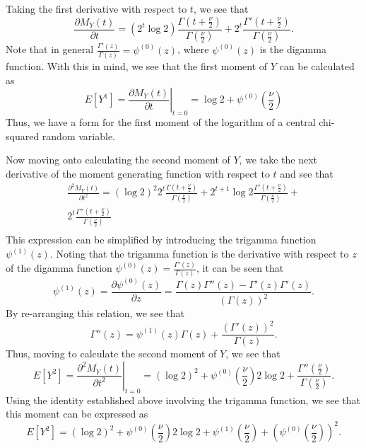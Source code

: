 Taking the first derivative with respect to $t$, we see that
\begin{equation}
	\frac{\partial M_Y(t)}{\partial t} = (2^t \log 2) \frac{\Gamma (t + \frac{\nu}{2})}{\Gamma (\frac{\nu}{2})} + 2^t \frac{\Gamma ' (t + \frac{\nu}{2})}{\Gamma (\frac{\nu}{2})} .
\end{equation}
Note that in general $\frac{\Gamma ' (z)}{\Gamma (z)} = \psi^{(0)}(z)$, where $\psi^{(0)}(z)$ is the digamma function. With this in mind, we see that the first moment of
$Y$ can be calculated as
\begin{equation}
	E \left[ Y^1 \right] =  \left. \frac{\partial M_Y(t)}{\partial t} \right|_{t=0} = \log 2 + \psi^{(0)} \left( \frac{\nu}{2} \right)
\end{equation}
Thus, we have a form for the first moment of the logarithm of a central chi-squared random variable.

Now moving onto calculating the second moment of $Y$, we take the next derivative of the moment generating function with respect to $t$ and see that
\begin{equation}
	\begin{split}
		\frac{\partial^2 M_Y(t)}{\partial t^2} = (\log 2)^2 2^t  \frac{\Gamma (t + \frac{\nu}{2})}{\Gamma (\frac{\nu}{2})} + 2^{t+1} \log 2 \frac{\Gamma ' (t + \frac{\nu}{2})}{\Gamma (\frac{\nu}{2})} + \\ 
		2^t \frac{\Gamma '' (t + \frac{\nu}{2})}{\Gamma (\frac{\nu}{2})} \\
	\end{split}
\end{equation}
This expression can be simplified by introducing the trigamma function $ \psi^{(1)}(z)$. Noting that the trigamma function is the derivative with respect
to $z$ of the digamma function $\psi^{(0)}(z) = \frac{\Gamma ' (z)}{\Gamma (z)}$, it can be seen that
\begin{equation}
	\psi^{(1)}(z) = \frac{\partial \psi^{(0)}(z)}{\partial z} = \frac{\Gamma (z) \Gamma '' (z) - \Gamma '(z) \Gamma '(z)}{(\Gamma(z))^2} .
\end{equation}
By re-arranging this relation, we see that
\begin{equation}
	\Gamma ''(z) = \psi^{(1)}(z) \Gamma(z) + \frac{(\Gamma '(z))^2}{\Gamma(z)} .
\end{equation}
Thus, moving to calculate the second moment of $Y$, we see that
\begin{equation}
	E \left[ Y^2 \right] =  \left. \frac{\partial^2 M_Y(t)}{\partial t^2} \right|_{t=0} =
	(\log 2)^2 + \psi^{(0)} \left( \frac{\nu}{2} \right) 2 \log 2  + \frac{\Gamma '' (\frac{\nu}{2})}{\Gamma (\frac{\nu}{2})} .
\end{equation}
Using the identity established above involving the trigamma function, we see that this moment can be expressed as
\begin{equation}
	E \left[ Y^2 \right] =
	(\log 2)^2 + \psi^{(0)} \left( \frac{\nu}{2} \right) 2 \log 2  + \psi^{(1)} \left( \frac{\nu}{2} \right) + \left( \psi^{(0)} \left( \frac{\nu}{2} \right) \right)^2 .
\end{equation}

